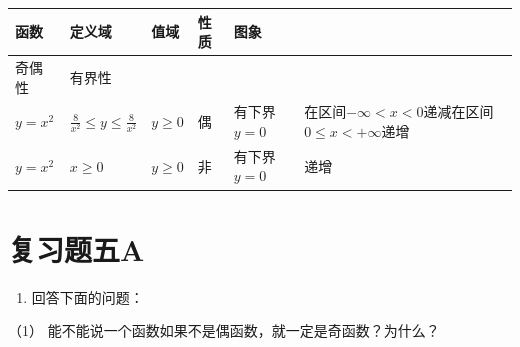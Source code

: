 {\def\LTcaptype{none} %
\begin{longtable}[]{@{}
  >{\raggedright\arraybackslash}p{}
  >{\raggedright\arraybackslash}p{}
  >{\raggedright\arraybackslash}p{}
  >{\raggedright\arraybackslash}p{}
  >{\raggedright\arraybackslash}p{}
  >{\raggedright\arraybackslash}p{}@{}}
\toprule\noalign{}
\begin{minipage}[b]{\linewidth}\raggedright
函数
\end{minipage} & \begin{minipage}[b]{\linewidth}\raggedright
定义域
\end{minipage} & \begin{minipage}[b]{\linewidth}\raggedright
值域
\end{minipage} & \begin{minipage}[b]{\linewidth}\raggedright
性质
\end{minipage} & \begin{minipage}[b]{\linewidth}\raggedright
图象
\end{minipage} & \begin{minipage}[b]{\linewidth}\raggedright
\end{minipage} \\
\midrule\noalign{}
\endhead
\bottomrule\noalign{}
\endlastfoot
奇偶性 & 有界性 & & & & \\
\(y = x^2\) & \(\frac{8}{x^2} \leqslant y \leqslant \frac{8}{x^2}\) &
\(y \geq 0\) & 偶 & 有下界\(y = 0\) &
在区间\(-\infty < x < 0\)递减在区间\(0 \leqslant x < +\infty\)递增 \\
\(y = x^2\) & \(x \geq 0\) & \(y \geq 0\) & 非 & 有下界\(y = 0\) &
递增 \\
\end{longtable}
}

\section{复习题五A}

\begin{enumerate}
\item
  回答下面的问题：
\end{enumerate}

（1） 能不能说一个函数如果不是偶函数，就一定是奇函数？为什么？

